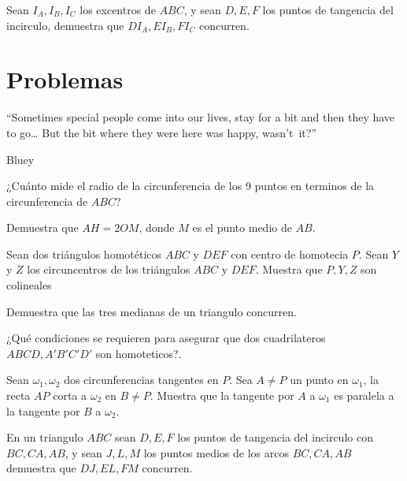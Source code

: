 \documentclass[11pt]{scrartcl}
\begin{document}
\begin{problem}
Sean $I_A,I_B,I_C$ los excentros de $ABC$, y sean $D,E,F$ los puntos de tangencia del incirculo, demuestra que $DI_A, EI_B, FI_C$ concurren.
\end{problem}



\newpage
\section{Problemas}

\epigraph{“Sometimes special people come into our lives, stay for a bit and then they have to go… But the bit where they were here was happy, wasn’t it?”}{Bluey}


\begin{problem}
    ¿Cuánto mide el radio de la circunferencia de los 9 puntos en terminos de la circunferencia de $ABC$?
\end{problem}


\begin{problem}
Demuestra que $AH=2OM$, donde $M$ es el punto medio de $AB$.
\end{problem}



\begin{problem}
Sean dos triángulos homotéticos $ABC$ y $DEF$ con centro de homotecia $P$. Sean $Y$ y $Z$ los circuncentros de
los triángulos $ABC$ y $DEF$. Muestra que $P, Y , Z$ son colineales
\end{problem}

\begin{problem}
    Demuestra que las tres medianas de un triangulo concurren.
\end{problem}




\begin{problem}
¿Qué condiciones se requieren para asegurar que dos cuadrilateros $ABCD, A'B'C'D'$ son homoteticos?.
\end{problem}

\begin{problem}
    Sean $\omega_1, \omega_2$ dos circunferencias tangentes en $P$. Sea $A\neq P$ un punto en $\omega_1$, la recta $AP$ corta a $\omega_2$ en $B\neq P$. Muestra que la tangente por $A$ a $\omega_1$ es paralela a la tangente por $B$ a $\omega_2$.
\end{problem}


\begin{problem}
En un triangulo $ABC$ sean $D,E,F$ los puntos de tangencia del incirculo con $BC,CA,AB$, y sean $J,L,M$ los puntos medios de los arcos $BC,CA,AB$ demuestra que $DJ,EL,FM$ concurren.
\end{problem}
\end{document}
